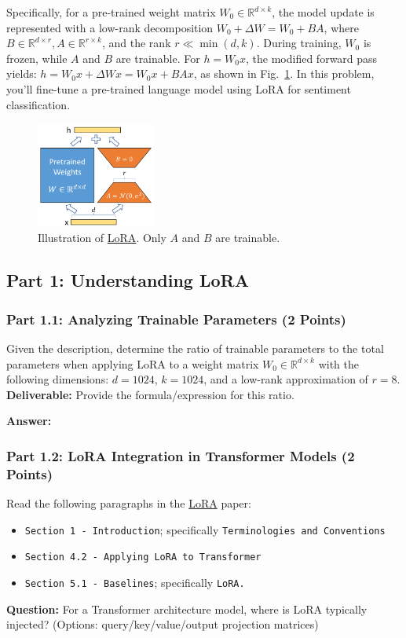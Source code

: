\documentclass[11pt, oneside]{article}   	%
\begin{document}
Specifically, for a pre-trained weight matrix $W_0\in \mathbb{R}^{d\times k}$, the model update is represented with a low-rank decomposition $W_0+\Delta W=W_0+BA$, where $B\in \mathbb{R}^{d\times r}, A\in \mathbb{R}^{r\times k}$, and the rank $r \ll \min(d,k)$.
During training, $W_0$ is frozen, while $A$ and $B$ are trainable. For $h = W_0x$, the modified forward pass yields: $h = W_0 x + \Delta W x = W_0 x + BA x$, as shown in Fig.~\ref{fig:lora}.
In this problem, you'll fine-tune a pre-trained language model using LoRA for sentiment classification. 

\begin{figure}[h]
    \centering
    \includegraphics[width=0.35\textwidth]{images/lora.png}
    \caption{
    Illustration of \href{https://arxiv.org/pdf/2106.09685.pdf}{LoRA}. Only $A$ and $B$ are trainable.
    }
    \label{fig:lora}
\end{figure}


\subsection*{Part 1: Understanding LoRA}
\subsubsection*{Part 1.1: Analyzing Trainable Parameters (2 Points)}
Given the description, determine the ratio of trainable parameters to the total parameters when applying LoRA to a weight matrix $W_0\in \mathbb{R}^{d\times k}$ with the following dimensions: $d = 1024$, $k = 1024$, and a low-rank approximation of $r = 8$. \\
\textbf{Deliverable:}
Provide the formula/expression for this ratio.

\textbf{Answer:} \\

\subsubsection*{Part 1.2: LoRA Integration in Transformer Models (2 Points)}
Read the following paragraphs in the \href{https://arxiv.org/abs/2106.09685}{LoRA} paper:
\begin{itemize}
    \item \texttt{Section 1 - Introduction}; specifically \texttt{Terminologies and Conventions}
    \item \texttt{Section 4.2 - Applying LoRA to Transformer}
    \item \texttt{Section 5.1 - Baselines}; specifically \texttt{LoRA.}
\end{itemize}
\textbf{Question:}
For a Transformer architecture model, where is LoRA typically injected? (Options: query/key/value/output projection matrices)
\end{document}
